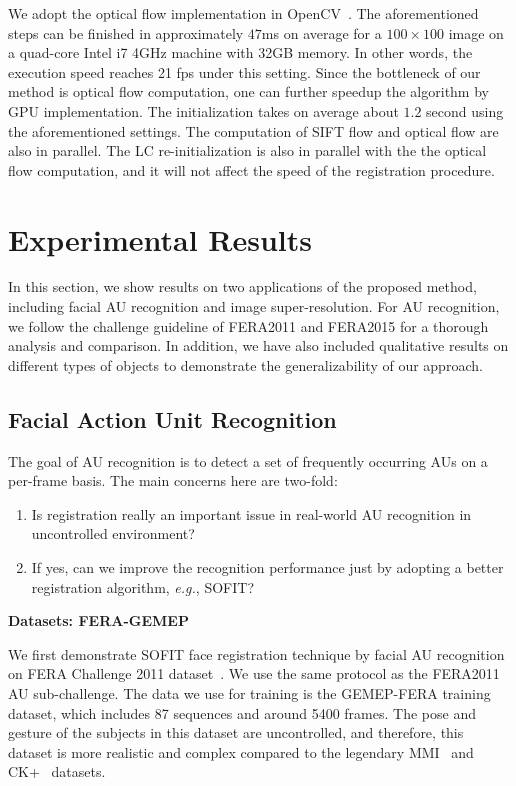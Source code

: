 \documentclass[review]{elsarticle}
\begin{document}
We adopt the optical flow implementation in OpenCV~\cite{opencv}. The aforementioned steps can be finished in approximately $47$ms on average for a $100\times100$ image on a quad-core Intel i7 4GHz machine with 32GB memory. In other words, the execution speed reaches 21 fps under this setting. Since the bottleneck of our method is optical flow computation, one can further speedup the algorithm by GPU implementation. The initialization takes on average about $1.2$ second using the aforementioned settings. The computation of SIFT flow and optical flow are also in parallel. The LC re-initialization is also in parallel with the the optical flow computation, and it will not affect the speed of the registration procedure. 


\section{\label{sec:experiment}Experimental Results}

In this section, we show results on two applications of the proposed method, including facial AU recognition and image super-resolution. For AU recognition, we follow the challenge guideline of FERA2011 and FERA2015 for a thorough analysis and comparison. In addition, we have also included qualitative results on different types of objects to demonstrate the generalizability of our approach.

\subsection{Facial Action Unit Recognition}

The goal of AU recognition is to detect a set of frequently occurring AUs on a per-frame basis. The main concerns here are two-fold:
\begin{enumerate}
	\item Is registration really an important issue in real-world AU recognition in uncontrolled environment?
	\item If yes, can we improve the recognition performance just by adopting a better registration algorithm, \textit{e.g.}, SOFIT?
\end{enumerate}

\noindent \textbf{Datasets: FERA-GEMEP}

We first demonstrate SOFIT face registration technique by facial AU recognition on FERA Challenge 2011 dataset~\cite{FERA11}. We use the same protocol as the FERA2011~\cite{Valstar_FERA11} AU sub-challenge. The data we use for training is the GEMEP-FERA training dataset, which includes 87 sequences and around 5400 frames. The pose and gesture of the subjects in this dataset are uncontrolled, and therefore, this dataset is more realistic and complex compared to the legendary MMI~\cite{Pantic_ICME05} and CK+~\cite{Kanade_FG00} datasets.
\end{document}
